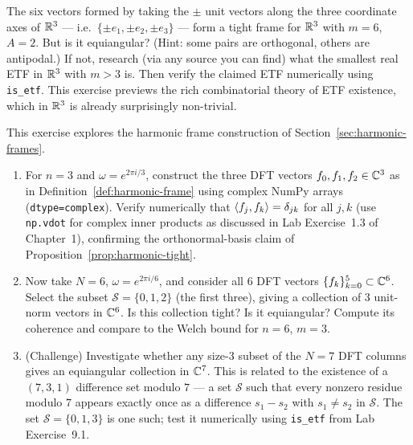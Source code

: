 \begin{exercisebox}[title={Lab Exercise 9.5 (Optional, Challenge): ETFs in $\R^3$}]
The six vectors formed by taking the $\pm$ unit vectors along the three
coordinate axes of $\R^3$ --- i.e.\ $\{\pm e_1,\pm e_2,\pm e_3\}$ ---
form a tight frame for $\R^3$ with $m=6$, $A=2$. But is it equiangular?
(Hint: some pairs are orthogonal, others are antipodal.) If not, research
(via any source you can find) what the smallest real ETF in $\R^3$ with
$m>3$ is. Then verify the claimed ETF numerically using \texttt{is\_etf}.
This exercise previews the rich combinatorial theory of ETF existence,
which in $\R^3$ is already surprisingly non-trivial.
\end{exercisebox}

\begin{exercisebox}[title={Lab Exercise 9.6 (Optional): Harmonic Frames in $\C^n$}]
This exercise explores the harmonic frame construction of
Section~\ref{sec:harmonic-frames}.
\begin{enumerate}[label=(\alph*)]
  \item For $n=3$ and $\omega=e^{2\pi i/3}$, construct the three DFT
        vectors $f_0,f_1,f_2\in\mathbb{C}^3$ as in Definition~\ref{def:harmonic-frame}
        using complex NumPy arrays (\texttt{dtype=complex}). Verify
        numerically that $\left\langle f_j, f_k \right\rangle=\delta_{jk}$ for all $j,k$
        (use \texttt{np.vdot} for complex inner products as discussed in
        Lab Exercise~1.3 of Chapter~1), confirming the orthonormal-basis
        claim of Proposition~\ref{prop:harmonic-tight}.
  \item Now take $N=6$, $\omega=e^{2\pi i/6}$, and consider all $6$ DFT
        vectors $\{f_k\}_{k=0}^5\subset\mathbb{C}^6$. Select the subset
        $\mathcal S=\{0,1,2\}$ (the first three), giving a collection of
        $3$ unit-norm vectors in $\mathbb{C}^6$. Is this collection tight? Is it
        equiangular? Compute its coherence and compare to the Welch bound
        for $n=6$, $m=3$.
  \item (Challenge) Investigate whether any size-3 subset of the $N=7$
        DFT columns gives an equiangular collection in $\mathbb{C}^7$. This is
        related to the existence of a $(7,3,1)$ difference set modulo $7$
        --- a set $\mathcal S$ such that every nonzero residue modulo $7$
        appears exactly once as a difference $s_1-s_2$ with $s_1\ne s_2$
        in $\mathcal S$. The set $\mathcal S=\{0,1,3\}$ is one such; test
        it numerically using \texttt{is\_etf} from Lab Exercise~9.1.
\end{enumerate}
\end{exercisebox}
\newpage
